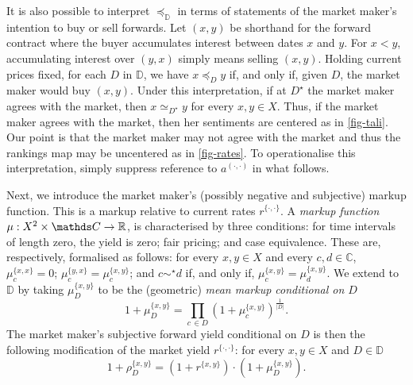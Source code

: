 \documentclass[12pt,a4paper,twoside]{article}
\newcommand{\mbbd}{{\mathds D}}
\newcommand{\mbbc}{{\mathds C}}
\newcommand{\past}{{D^\star}}
\newcommand{\xy}{{(x, y)}}
\newcommand{\dd}{{(\cdot,\cdot)}}
\begin{document}
\begin{remark*}
It is also possible to interpret $\preceq_\mbbd$ in terms of statements of the
  market maker's intention to buy or sell forwards. Let $(x, y)$ be shorthand
  for the forward contract where the buyer accumulates interest between dates
  $x$ and $y$. For $x < y$, 
accumulating interest over $(y, x)$ simply means selling $(x, y)$.  Holding
  current prices fixed, for each $D$ in $ \mbbd$, we have $x \preceq_{D} y$ if,
  and only if, given $D$, the market maker would buy $(x, y)$. Under this
  interpretation, if at $\past$ the market maker agrees with the market, then
  $x \simeq_{\past} y$ for every $x, y \in X$. Thus, if the market maker agrees
  with the market, then her {sentiments} are centered as in \cref{fig-tali}.
  Our point is that the market maker may not agree with the market and thus the
  rankings map may be uncentered as in \cref{fig-rates}.  To operationalise
  this interpretation, simply suppress reference to $a^{\dd}$ in
  what follows.%
\end{remark*}

Next, we introduce the market maker's (possibly negative and subjective) markup
function. This is a markup relative to current rates $r^{\{\cdot, \cdot\}}$.  A
\emph{markup function} $\mu : X^2 \times \mbbc \rightarrow \R$, is
characterised by three conditions: for time intervals of length zero, the yield
is zero; fair pricing; and case equivalence.  These are, respectively,
formalised as follows: for every $x,y\in X$ and every $c , d\in \mbbc$,
$\mu^{\{x,x\}}_{c} = 0$; $\mu^{\{y,x\}}_{c} = \mu^{\{x,y\}}_{c}$; and $c
\sim^{\star} d$ if, and only if, $\mu^{\{x,y\}}_{c} = \mu^{\{x,y\}}_{d}$.  We
extend to $\mbbd$ by taking $\mu^{\{x, y\}}_{D}$ to be the (geometric)
\emph{mean markup conditional on $D$}
\begin{equation*} 1 + \mu^{\{x, y\}}_{D}
= \prod_{c\,\in D} \left(1 + \mu^{\{x, y\}}_{c}\right)^{\frac{1}{\lvert D
  \rvert}}.
\end{equation*}
The market maker's subjective forward yield conditional on $D$ is then
the following modification of the market yield $r^{\{\cdot,\cdot\}}$:
for every $x,y\in X$ and $D \in \mbbd$
\begin{equation*}
  1 + \rho^{\{x,y\}}_{D} = \left(1 + r^{\{x,y\}}\right)\cdot\left(1 +
  \mu^{\{x,y\}}_{D}\right).
\end{equation*}
\end{document}
